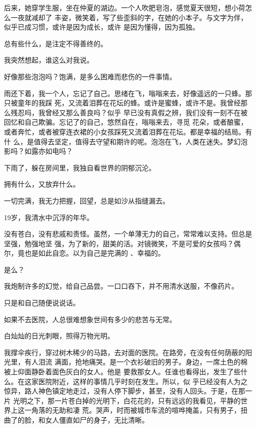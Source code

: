 \documentclass[12pt,a4paper]{article}
\begin{document}
		后来，她穿学生服，坐在仲夏的湖边。一个人吹肥皂泡，感觉夏天很短，想小荷怎么一夜就减却了
	丰姿，微笑着，写了些歪斜的字，在她的小本子。与文字为伴，似乎已成习惯，或许是因为成长，或许
	是因为懂得，因为孤独。

		总有些什么，是注定不得善终的。

		我突然想起，谁这么对我说。

		好像那些泡泡吗？饱满，是多么困难而悲伤的一件事情。

		雨还下着，我一个人，忘记了自己。思绪在飞，嗡嗡来去，好像遥远的一只蜂。那只被童年的我踩
	死，又流着泪葬在花坛的蜂。或许是蜜蜂，或许不是。我曾经那么残忍吗，我曾经又那么善良吗？似乎
	早已没有真假之辨，我们没有一刻不在被回忆和自己欺骗。忘记了的自己，悠然自在，嗡嗡来去，寻觅
	花朵，或者酿蜜，或者奔忙，或者被穿连衣裙的小女孩踩死又流着泪葬在花坛。都是幸福的结局。有什
	么，是值得去坚定，值得去守望和期许的呢。泡泡在飞，人类在迷失。梦幻泡影吗？如露亦如电吗？

		下雨了，躲在房间里，我独自看世界的阴郁沉沦。

	\endwriting



		拥有什么，又放弃什么。

		一切完满，我无力把握，回望，总是如沙从指缝漏去。

		19岁，我清水中沉浮的年华。

		没有苍白，没有悲戚和责怪。虽然，一个单薄无力的自己，常常难以支持。但总是坚强，勉强地坚
	强，为了新的，甜美的活。对镜微笑，不是可爱的女孩吗？偶尔，竟也是如此自恋。以为自己是完满的
	、幸福的。

		是么？

		我炮制许多的幻觉，给自己品尝。一口口吞下，并不用清水送服，不像药片。

		只是和自己随便说说话。

	\endwriting



		如果不去医院，人总很难想象世间有多少的悲苦与无常。

		白灿灿的日光刺眼，照得万物光明。

		我撑伞疾行，穿过树木稀少的马路，去对面的医院。在路旁，在没有任何荫蔽的阳光里，有人泪流
	满面，抢地痛哭。是一个衣衫破旧的男子。身边，一席土色的棉被上仰面静卧着面色灰白的女人。他是
	要救那女人。任谁也看得出，发生了些什么。在这家医院附近，这样的事情几乎时刻在发生。所以，似
	乎已经没有人为之惊异，路人神色镇定地走过，没有人停下脚步，甚至，没有人回头。于是，在那一片
	光明之下，那一片苍白掉的光明下，白花花的，只有远远的我看见，平静的世界上这一角落的无助和凄
	荒。哭声，时而被城市车流的喧哗掩盖，只有男子，扭曲了的脸，和女人僵直如尸的身子，无比清晰。
\end{document}
